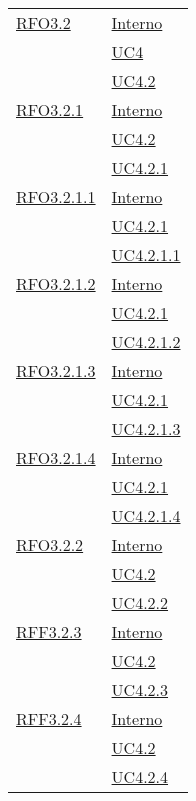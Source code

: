 \begin{longtable}{|>{\centering}m{5cm}|m{5cm}<{\centering}|}
\hyperlink{RFO3.2}{RFO3.2} &  \hyperlink{Interno}{Interno}\\ &\hyperref[UC4]{UC4}\\ &\hyperref[UC4.2]{UC4.2}\\ \hline

\hyperlink{RFO3.2.1}{RFO3.2.1} &  \hyperlink{Interno}{Interno}\\ &\hyperref[UC4.2]{UC4.2}\\ &\hyperref[UC4.2.1]{UC4.2.1}\\ \hline

\hyperlink{RFO3.2.1.1}{RFO3.2.1.1} & \hyperlink{Interno}{Interno}\\ &\hyperref[UC4.2.1]{UC4.2.1}\\ &\hyperref[UC4.2.1.1]{UC4.2.1.1}\\ \hline

\hyperlink{RFO3.2.1.2}{RFO3.2.1.2} &  \hyperlink{Interno}{Interno}\\ &\hyperref[UC4.2.1]{UC4.2.1}\\ &\hyperref[UC4.2.1.2]{UC4.2.1.2}\\ \hline

\hyperlink{RFO3.2.1.3}{RFO3.2.1.3} & \hyperlink{Interno}{Interno}\\ &\hyperref[UC4.2.1]{UC4.2.1}\\ &\hyperref[UC4.2.1.3]{UC4.2.1.3}\\ \hline

\hyperlink{RFO3.2.1.4}{RFO3.2.1.4} &  \hyperlink{Interno}{Interno}\\ &\hyperref[UC4.2.1]{UC4.2.1}\\ &\hyperref[UC4.2.1.4]{UC4.2.1.4}\\ \hline

\hyperlink{RFO3.2.2}{RFO3.2.2} &\hyperlink{Interno}{Interno}\\ &\hyperref[UC4.2]{UC4.2}\\ &\hyperref[UC4.2.2]{UC4.2.2}\\ \hline

\hyperlink{RFF3.2.3}{RFF3.2.3} &  \hyperlink{Interno}{Interno}\\ &\hyperref[UC4.2]{UC4.2}\\ &\hyperref[UC4.2.3]{UC4.2.3}\\ \hline

\hyperlink{RFF3.2.4}{RFF3.2.4} &  \hyperlink{Interno}{Interno}\\ &\hyperref[UC4.2]{UC4.2}\\ &\hyperref[UC4.2.4]{UC4.2.4}\\ \hline


\end{longtable}

